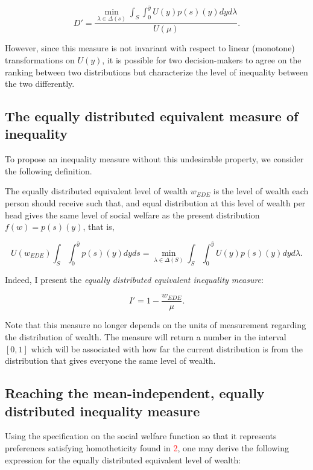 \documentclass[\econtexRoot/IneqMeas]{subfiles}
\begin{document}
$$ D' = \frac{\min_{\lambda \in \Delta(s)} \int_{S} \int_{0}^{\bar{y}} U(y) p(s)(y) dyd\lambda }{U(\mu)}.$$ 

\par However, since this measure is not invariant with respect to linear (monotone) transformations on $U(y)$, it is possible for two decision-makers to agree on the ranking between two distributions but characterize the level of inequality between the two differently.

\subsection{The equally distributed equivalent measure of inequality}

\par To propose an inequality measure without this undesirable property, we consider the following definition.

\begin{dfn}
The equally distributed equivalent level of wealth $w_{EDE}$ is the level of wealth each person should receive such that, and equal distribution at this level of wealth per head gives the same level of social welfare as the present distribution $f(w) = p(s)(y)$, that is,

$$ U(w_{EDE}) \int_S \int_{0}^{\bar{y}} p(s)(y) dyds = \min_{\lambda \in \Delta(S)} \int_{S} \int_{0}^{\bar{y}} U(y)p(s)(y)dyd\lambda.$$
\end{dfn}

\par Indeed, I present the \textit{equally distributed equivalent inequality measure}:

$$ I' = 1 - \frac{w_{EDE}}{\mu}. $$

\par Note that this measure no longer depends on the units of measurement regarding the distribution of wealth. The measure will return a number in the interval $[0,1]$ which will be associated with how far the current distribution is from the distribution that gives everyone the same level of wealth.

\subsection{Reaching the mean-independent, equally distributed inequality measure}
 
\par Using the specification on the social welfare function so that it represents preferences satisfying homotheticity found in \textcolor{red}{2}, one may derive the following expression for the equally distributed equivalent level of wealth:
\end{document}
